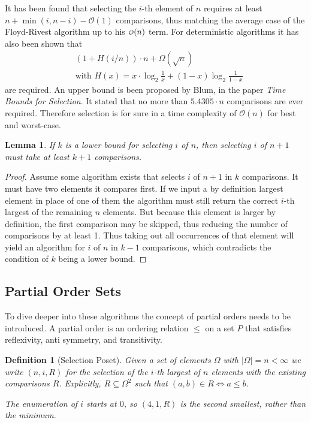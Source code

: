 \documentclass[10pt,journal,compsoc]{IEEEtran}
\newcommand\smallO{
  \mathchoice
    {{\scriptstyle\mathcal{O}}}%
    {{\scriptstyle\mathcal{O}}}%
    {{\scriptscriptstyle\mathcal{O}}}%
    {\scalebox{.50}{$\scriptscriptstyle\mathcal{O}$}}%
  }
\newtheorem{lemma}{Lemma}
\newtheorem{definition}{Definition}
\begin{document}
It has been found that selecting the $i$-th element of $n$ requires at least
$n+\min(i,n-i)-\mathcal{O}(1)$ comparisons, thus matching the average case of the Floyd-Rivest
algorithm up to his $\smallO(n)$ term. For deterministic algorithms it has also been shown that
\begin{eqnarray*}
  &\left (1 + H(i/n) \right ) \cdot n + \Omega(\sqrt n) \\
  &\text{with~} H(x) = x \cdot \log_2 \frac{1}{x} + (1-x) \log_2 \frac{1}{1-x}
\end{eqnarray*}
are required. An upper bound is been proposed by Blum, in the paper \textit{Time Bounds for
  Selection}. It stated that no more than $5.430\dot{5} \cdot n$ comparisons are ever required.
Therefore selection is for sure in a time complexity of $\mathcal{O}(n)$ for best and worst-case.

\begin{lemma}
  If $k$ is a lower bound for selecting $i$ of $n$, then selecting $i$ of $n+1$ must take at least $k+1$ comparisons.
\end{lemma}
\begin{proof}
  Assume some algorithm exists that selects $i$ of $n+1$ in $k$ comparisons. It must have two elements it compares first.
  If we input a by definition largest element in place of one of them the algorithm must still return the correct $i$-th
  largest of the remaining $n$ elements. But because this element is larger by definition, the first comparison may be
  skipped, thus reducing the number of comparisons by at least 1. Thus taking out all occurrences of that element will
  yield an algorithm for $i$ of $n$ in $k-1$ comparisons, which contradicts the condition of $k$ being a lower bound.
\end{proof}

\subsection{Partial Order Sets}
To dive deeper into these algorithms the concept of partial orders needs to be introduced. A partial
order is an ordering relation
$\leq$ on a set $P$ that satisfies reflexivity, anti symmetry, and transitivity.

\begin{definition}[Selection Poset]
  Given a set of elements $\Omega$ with $|\Omega| = n < \infty$ we write
  $(n, i, R)$ for the selection of the $i$-th largest of $n$ elements
  with the existing comparisons $R$.
  Explicitly, $R\subseteq\Omega^2$ such that $(a, b)\in R \Longleftrightarrow a \leq b$.

  The enumeration of $i$ starts at $0$, so $(4, 1, R)$ is the second smallest,
  rather than the minimum.
\end{definition}
\end{document}
